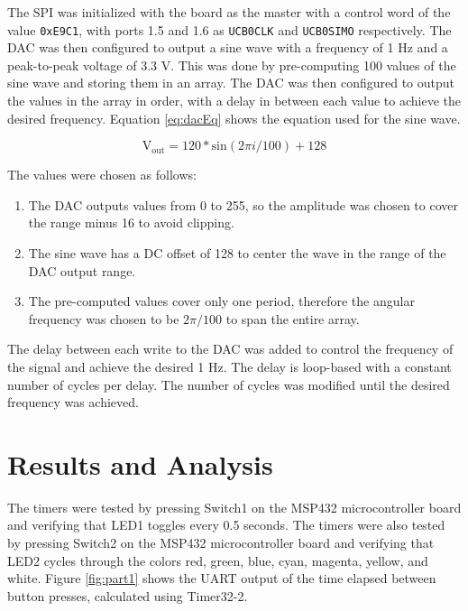 \documentclass[CMPE]{KGCOEReport}
\begin{document}
The SPI was initialized with the board as the master with a control word of the value \verb|0xE9C1|, with ports 1.5 and 1.6 as \verb|UCB0CLK| and \verb|UCB0SIMO| respectively. The DAC was then configured to output a sine wave with a frequency of 1 Hz and a peak-to-peak voltage of 3.3 V. This was done by pre-computing 100 values of the sine wave and storing them in an array. The DAC was then configured to output the values in the array in order, with a delay in between each value to achieve the desired frequency. Equation \ref{eq:dacEq} shows the equation used for the sine wave.

\begin{equation}
\text{V}_\text{out} = 120 * \text{sin}(2\pi i / 100) + 128
\label{eq:dacEq}
\end{equation}

The values were chosen as follows:

\begin{enumerate}
    \item The DAC outputs values from 0 to 255, so the amplitude was chosen to cover the range minus 16 to avoid clipping.
    \item The sine wave has a DC offset of 128 to center the wave in the range of the DAC output range.
    \item The pre-computed values cover only one period, therefore the angular frequency was chosen to be $2\pi / 100$ to span the entire array.
\end{enumerate}

The delay between each write to the DAC was added to control the frequency of the signal and achieve the desired 1 Hz. The delay is loop-based with a constant number of cycles per delay. The number of cycles was modified until the desired frequency was achieved.


\section*{Results and Analysis}


The timers were tested by pressing Switch1 on the MSP432 microcontroller board and verifying that LED1 toggles every 0.5 seconds. The timers were also tested by pressing Switch2 on the MSP432 microcontroller board and verifying that LED2 cycles through the colors red, green, blue, cyan, magenta, yellow, and white. Figure \ref{fig:part1} shows the UART output of the time elapsed between button presses, calculated using Timer32-2.
\end{document}
